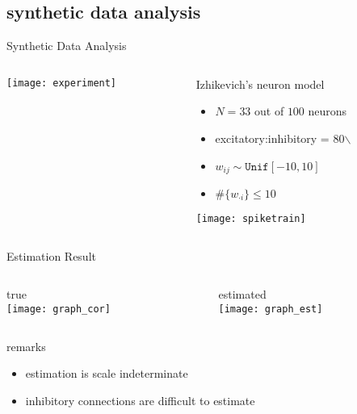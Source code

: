 \documentclass[fleqn,aspectratio=1610]{beamer}
\begin{document}
\subsection{synthetic data analysis}
\label{sec:orga7797ba}
\begin{frame}[label={sec:org2dbc036}]{Synthetic Data Analysis}
\begin{columns}
\begin{column}{0.5\columnwidth}
\centering
\texttt{[image: experiment]}
\end{column}
\begin{column}{0.5\columnwidth}
Izhikevich's neuron model\\[0pt]
\parencite{Izhikevich2003}
\begin{itemize}
\item \(N=33\) out of \(100\) neurons
\item excitatory:inhibitory = 80$\backslash$%
\item \(w_{ij}\sim\texttt{Unif}[-10,10]\)
\item \(\#\{w_{\cdot i}\}\leq 10\)
\end{itemize}
\centering
\texttt{[image: spiketrain]}
\end{column}
\end{columns}
\end{frame}
\begin{frame}[label={sec:org222c81b}]{Estimation Result}
\begin{columns}
\begin{column}{0.5\columnwidth}
\centering
true\\[0pt]
\texttt{[image: graph\_cor]}
\end{column}
\begin{column}{0.5\columnwidth}
\centering
estimated\\[0pt]
\texttt{[image: graph\_est]}
\end{column}
\end{columns}
\begin{alertblock}{remarks}
\begin{itemize}
\item estimation is scale indeterminate
\item inhibitory connections are difficult to estimate
\end{itemize}
\end{alertblock}
\end{frame}
\end{document}
